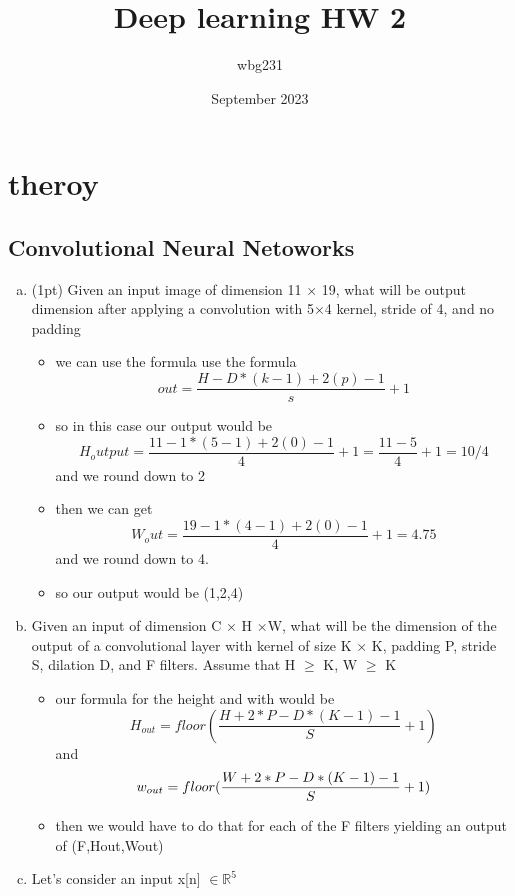 \documentclass{article}
\title{Deep learning HW 2}
\author{wbg231 }
\date{September 2023}
\begin{document}
\maketitle

\section{theroy}
\subsection{Convolutional Neural Netoworks}
\begin{enumerate}[(a)] %
\item (1pt) Given an input image of dimension 11 × 19, what will be output
dimension after applying a convolution with 5×4 kernel, stride of 4, and no
padding
\begin{itemize}
    \color{blue}
        \item we can use the formula use the formula $$out = \frac{H-D*(k-1)+2(p)-1}{s}+1$$ 
        \item so in this case our output would be $$H_output = \frac{11-1*(5-1)+2(0)-1}{4}+1 =\frac{11-5}{4}+1=10/4$$ and we round down to 2 
        \item then we can get $$W_out = \frac{19-1*(4-1)+2(0)-1}{4}+1=4.75$$ and we round down to 4. 
        \item so our output would be (1,2,4)
\end{itemize}
\item Given an input of dimension C × H ×W, what will be the dimension
of the output of a convolutional layer with kernel of size K × K, padding P,
stride S, dilation D, and F filters. Assume that H $\geq$ K, W $\geq$ K
\begin{itemize}
    \color{blue}
    \item our formula for the height and with would be  $$H_{out} = floor ( \frac{H + 2*P - D * (K-1)-1}{S} +1)$$ and $$\\
    w_{out} = floor ( \frac{W + 2*P - D * (K-1)-1}{S} + 1) $$
    \item then we would have to do that for each of the F filters yielding an output of (F,Hout,Wout)
\end{itemize}
\item Let’s consider an input x[n] $\in \mathbb{R}^{5}$


\end{enumerate}
\end{document}
